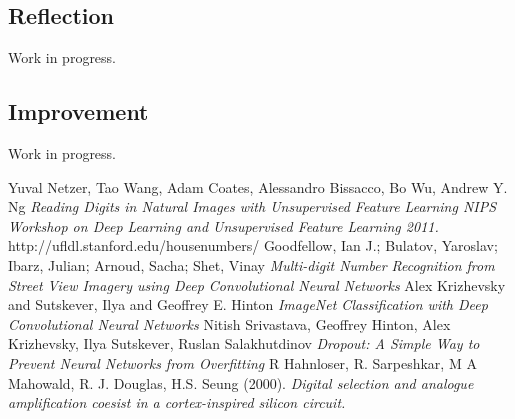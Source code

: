 \documentclass[12pt]{article}
\begin{document}
\subsection{Reflection}
Work in progress.

\subsection{Improvement}
Work in progress.


\begin{thebibliography}{9}
Yuval Netzer, Tao Wang, Adam Coates, Alessandro Bissacco, Bo Wu, Andrew Y. Ng 
\textit{Reading Digits in Natural Images with Unsupervised Feature Learning NIPS Workshop on Deep Learning and Unsupervised Feature Learning 2011.}
http://ufldl.stanford.edu/housenumbers/
Goodfellow, Ian J.; Bulatov, Yaroslav; Ibarz, Julian; Arnoud, Sacha; Shet, Vinay
\textit{Multi-digit Number Recognition from Street View Imagery using Deep Convolutional Neural Networks}
Alex Krizhevsky and Sutskever, Ilya and Geoffrey E. Hinton
\textit{ImageNet Classification with Deep Convolutional Neural Networks}
Nitish Srivastava, Geoffrey Hinton, Alex Krizhevsky, Ilya Sutskever, Ruslan Salakhutdinov
\textit{Dropout: A Simple Way to Prevent Neural Networks from Overfitting}
R Hahnloser, R. Sarpeshkar, M A Mahowald, R. J. Douglas, H.S. Seung (2000). 
\textit{Digital selection and analogue amplification coesist in a cortex-inspired silicon circuit.}

\end{thebibliography}
	
\end{document}
